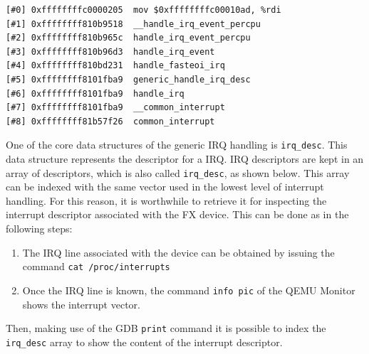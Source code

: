\begin{lstlisting}[style=c, caption={Output of the backtrace command. The first entry is the one corresponding to the interrupt handler registered with the driver}, label={list:backtrace}]
[#0] 0xffffffffc0000205  mov $0xffffffffc00010ad, %rdi
[#1] 0xffffffff810b9518  __handle_irq_event_percpu
[#2] 0xffffffff810b965c  handle_irq_event_percpu
[#3] 0xffffffff810b96d3  handle_irq_event
[#4] 0xffffffff810bd231  handle_fasteoi_irq
[#5] 0xffffffff8101fba9  generic_handle_irq_desc
[#6] 0xffffffff8101fba9  handle_irq
[#7] 0xffffffff8101fba9  __common_interrupt
[#8] 0xffffffff81b57f26  common_interrupt
\end{lstlisting}
\par
One of the core data structures of the generic IRQ handling is \texttt{irq\_desc}. This data structure represents the descriptor for a IRQ. IRQ descriptors are kept in an array of descriptors, which is also called \texttt{irq\_desc}, as shown below. This array can be indexed with the same vector used in the lowest level of interrupt handling. For this reason, it is worthwhile to retrieve it for inspecting the interrupt descriptor associated with the FX device. This can be done as in the following steps: 
\begin{enumerate}
    \item The IRQ line associated with the device can be obtained by issuing the command \texttt{cat /proc/interrupts}
    \item Once the IRQ line is known, the command \texttt{info pic} of the QEMU Monitor shows the interrupt vector.
\end{enumerate}
Then, making use of the GDB \texttt{print} command it is possible to index the \texttt{irq\_desc} array to show the content of the interrupt descriptor. 

